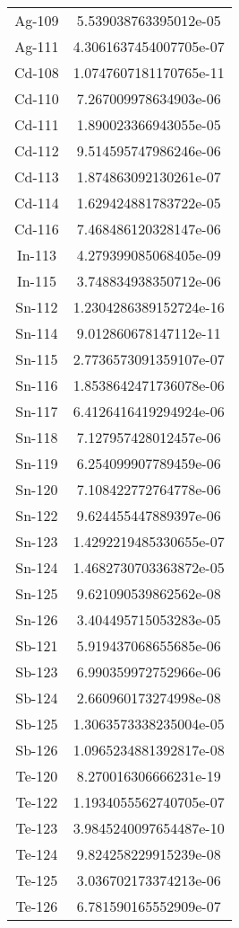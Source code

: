 \begin{table}[h!]
\begin{tabular}{|| c || c |}
Ag-109 & 5.539038763395012e-05 \\
Ag-111 & 4.3061637454007705e-07 \\
Cd-108 & 1.0747607181170765e-11 \\
Cd-110 & 7.267009978634903e-06 \\
Cd-111 & 1.890023366943055e-05 \\
Cd-112 & 9.514595747986246e-06 \\
Cd-113 & 1.874863092130261e-07 \\
Cd-114 & 1.629424881783722e-05 \\
Cd-116 & 7.468486120328147e-06 \\
In-113 & 4.279399085068405e-09 \\
In-115 & 3.748834938350712e-06 \\
Sn-112 & 1.2304286389152724e-16 \\
Sn-114 & 9.012860678147112e-11 \\
Sn-115 & 2.7736573091359107e-07 \\
Sn-116 & 1.8538642471736078e-06 \\
Sn-117 & 6.4126416419294924e-06 \\
Sn-118 & 7.127957428012457e-06 \\
Sn-119 & 6.254099907789459e-06 \\
Sn-120 & 7.108422772764778e-06 \\
Sn-122 & 9.624455447889397e-06 \\
Sn-123 & 1.4292219485330655e-07 \\
Sn-124 & 1.4682730703363872e-05 \\
Sn-125 & 9.621090539862562e-08 \\
Sn-126 & 3.404495715053283e-05 \\
Sb-121 & 5.919437068655685e-06 \\
Sb-123 & 6.990359972752966e-06 \\
Sb-124 & 2.660960173274998e-08 \\
Sb-125 & 1.3063573338235004e-05 \\
Sb-126 & 1.0965234881392817e-08 \\
Te-120 & 8.270016306666231e-19 \\
Te-122 & 1.1934055562740705e-07 \\
Te-123 & 3.9845240097654487e-10 \\
Te-124 & 9.824258229915239e-08 \\
Te-125 & 3.036702173374213e-06 \\
Te-126 & 6.781590165552909e-07 \\

\end{tabular}
\end{table}

